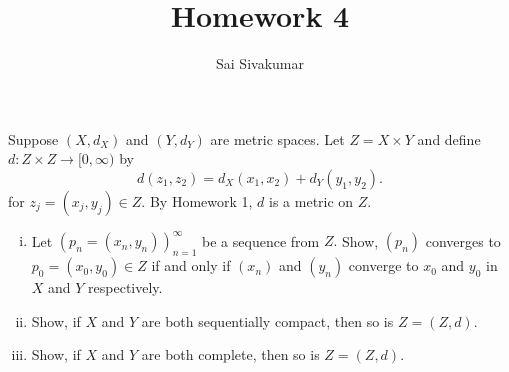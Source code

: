 \documentclass[12pt]{amsart}
\title{Homework 4}
\author{Sai Sivakumar}
\begin{document}
\maketitle

Suppose $(X,d_X)$ and $(Y,d_Y)$ are metric spaces.
 Let $Z=X\times Y$ and define $d:Z\times Z\to [0,\infty)$ by
\[
  d(z_1,z_2)= d_X(x_1,x_2)+d_Y(y_1,y_2).
\]
for  $z_j=(x_j,y_j) \in Z.$ By Homework 1, 
 $d$ is a metric on $Z.$  


\bigskip


\begin{enumerate}[(i)]
 \item Let $(p_n=(x_n,y_n))_{n=1}^\infty$ be a sequence from $Z.$ 
   Show, $(p_n)$ converges to $p_0=(x_0,y_0)\in Z$ if and only if
    $(x_n)$ and $(y_n)$ converge to $x_0$ and $y_0$ in $X$ and $Y$ respectively.
   \item Show, if $X$ and $Y$ are both sequentially compact, then so is  $Z=(Z,d).$
 \item Show, if $X$ and $Y$ are both complete, then so is $Z=(Z,d).$
\end{enumerate}
\end{document}
